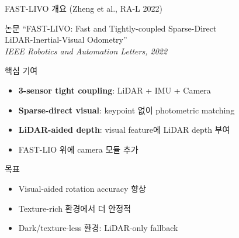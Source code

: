 
\begin{frame}{FAST-LIVO 개요 (Zheng et al., RA-L 2022)}
  \begin{block}{논문}
    ``FAST-LIVO: Fast and Tightly-coupled Sparse-Direct\\
    LiDAR-Inertial-Visual Odometry''\\
    \textit{IEEE Robotics and Automation Letters, 2022}
  \end{block}
  \pause
  \begin{block}{핵심 기여}
    \begin{itemize}
      \item \textbf{3-sensor tight coupling}: LiDAR + IMU + Camera
      \item \textbf{Sparse-direct visual}: keypoint 없이 photometric matching
      \item \textbf{LiDAR-aided depth}: visual feature에 LiDAR depth 부여
      \item FAST-LIO 위에 camera 모듈 추가
    \end{itemize}
  \end{block}
  \pause
  \begin{exampleblock}{목표}
    \begin{itemize}
      \item Visual-aided rotation accuracy 향상
      \item Texture-rich 환경에서 더 안정적
      \item Dark/texture-less 환경: LiDAR-only fallback
    \end{itemize}
  \end{exampleblock}
\end{frame}

